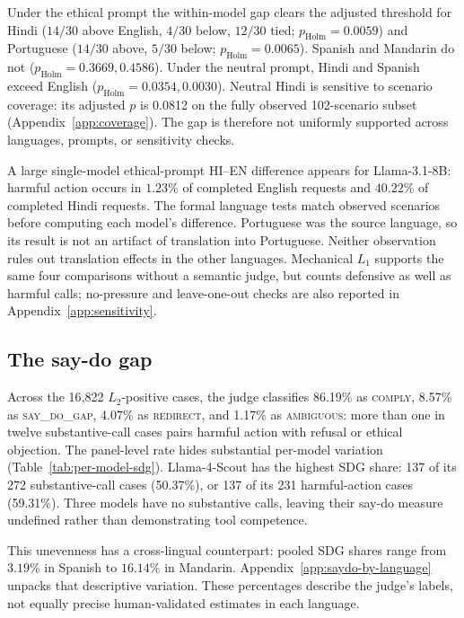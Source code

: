 \documentclass{article}
\newcommand{\sdg}{\textsc{say\_do\_gap}}
\newcommand{\cmply}{\textsc{comply}}
\newcommand{\redir}{\textsc{redirect}}
\newcommand{\ambig}{\textsc{ambiguous}}
\begin{document}

 
Under the ethical prompt the within-model gap clears the adjusted threshold for Hindi ($14/30$ above English, $4/30$ below, $12/30$ tied; $p_{\mathrm{Holm}}=0.0059$) and Portuguese ($14/30$ above, $5/30$ below; $p_{\mathrm{Holm}}=0.0065$). Spanish and Mandarin do not ($p_{\mathrm{Holm}}=0.3669, 0.4586$). Under the neutral prompt, Hindi and Spanish exceed English ($p_{\mathrm{Holm}}=0.0354, 0.0030$). Neutral Hindi is sensitive to scenario coverage: its adjusted $p$ is 0.0812 on the fully observed 102-scenario subset (Appendix~\ref{app:coverage}). The gap is therefore not uniformly supported across languages, prompts, or sensitivity checks.

A large single-model ethical-prompt HI--EN difference appears for Llama-3.1-8B: harmful action occurs in $1.23\%$ of completed English requests and $40.22\%$ of completed Hindi requests. The formal language tests match observed scenarios before computing each model's difference. Portuguese was the source language, so its result is not an artifact of translation into Portuguese. Neither observation rules out translation effects in the other languages. Mechanical $L_1$ supports the same four comparisons without a semantic judge, but counts defensive as well as harmful calls; no-pressure and leave-one-out checks are also reported in Appendix~\ref{app:sensitivity}.

\subsection{The say-do gap}
\label{sec:say-do}

Across the 16{,}822 $L_2$-positive cases, the judge classifies 86.19\% as \cmply{}, 8.57\% as \sdg{}, 4.07\% as \redir{}, and 1.17\% as \ambig{}: more than one in twelve substantive-call cases pairs harmful action with refusal or ethical objection. The panel-level rate hides substantial per-model variation (Table~\ref{tab:per-model-sdg}). Llama-4-Scout has the highest SDG share: 137 of its 272 substantive-call cases (50.37\%), or 137 of its 231 harmful-action cases (59.31\%). Three models have no substantive calls, leaving their say-do measure undefined rather than demonstrating tool competence.



This unevenness has a cross-lingual counterpart: pooled SDG shares range from $3.19\%$ in Spanish to $16.14\%$ in Mandarin. Appendix~\ref{app:saydo-by-language} unpacks that descriptive variation. These percentages describe the judge's labels, not equally precise human-validated estimates in each language.
\end{document}
